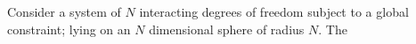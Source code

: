 Consider a system of $N$ interacting degrees of freedom subject to a global constraint; lying on an $N$ dimensional sphere of radius $N$. The 